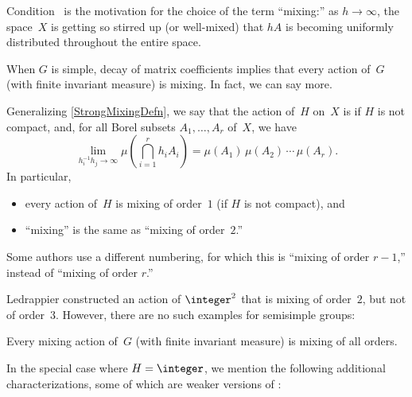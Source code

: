 \begin{rem}
Condition~ is the motivation for the choice of the term ``mixing:'' as $h \to \infty$, the space~$X$ is getting so stirred up (or well-mixed) that $hA$ is becoming uniformly distributed throughout the entire space.
\end{rem} 

When $G$ is simple, decay of matrix coefficients  implies that every action of~$G$ (with finite invariant measure) is mixing. In fact, we can say more.

\begin{defn}
Generalizing \cref{StrongMixingDefn}, we say that the action of~$H$ on~$X$ is  if $H$ is not compact, and, for all Borel subsets $A_1,\ldots,A_r$ of~$X$, we have
	$$ \lim_{h_i^{-1} h_j \to \infty} \mu \left( \bigcap_{i=1}^r h_i A_i \right)
		= \mu(A_1) \, \mu(A_2) \, \cdots \, \mu(A_r) .$$
In particular, 
	\begin{itemize}
	\item every action of~$H$ is mixing of order~$1$ (if $H$ is not compact),
	and
	\item ``mixing'' is the same as ``mixing of order~$2$\zz.''
	\end{itemize}
\end{defn}

\begin{warn}
Some authors use a different numbering, for which this is ``mixing of order $r-1$\zz,'' instead of ``mixing of order $r$\zz.'' 
\end{warn}

Ledrappier constructed an action of $\integer^2$ that is mixing of order~$2$, but not of order~$3$. However, there are no such examples for semisimple groups:

\begin{thm} \label{GMixing}
Every mixing action of~$G$ \textup(with finite invariant measure\/\textup) is mixing of all orders.
\end{thm}

In the special case where $H = \integer$, we mention the following additional characterizations, some of which are weaker versions of :

